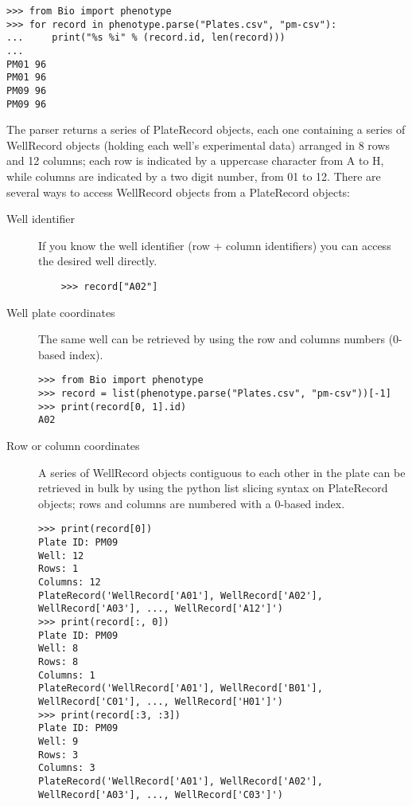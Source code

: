 \begin{verbatim}
>>> from Bio import phenotype
>>> for record in phenotype.parse("Plates.csv", "pm-csv"):
...     print("%s %i" % (record.id, len(record)))
...
PM01 96
PM01 96
PM09 96
PM09 96
\end{verbatim}

The parser returns a series of PlateRecord objects, each one containing a series of WellRecord objects
(holding each well's experimental data) arranged in 8 rows and 12 columns; each row is indicated by
a uppercase character from A to H, while columns are indicated by a two digit number, from 01 to 12.
There are several ways to access WellRecord objects from a PlateRecord objects:

\begin{description}
  \item[Well identifier]
    If you know the well identifier (row + column identifiers) you can access the desired well directly.
    \begin{verbatim}
    >>> record["A02"]
    \end{verbatim}

  \item[Well plate coordinates]
    The same well can be retrieved by using the row and columns numbers (0-based index).

\begin{verbatim}
>>> from Bio import phenotype
>>> record = list(phenotype.parse("Plates.csv", "pm-csv"))[-1]
>>> print(record[0, 1].id)
A02
\end{verbatim}

  \item[Row or column coordinates]
    A series of WellRecord objects contiguous to each other in the plate can be retrieved in bulk by
    using the python list slicing syntax on PlateRecord objects; rows and columns are numbered with
    a 0-based index.

\begin{verbatim}
>>> print(record[0])
Plate ID: PM09
Well: 12
Rows: 1
Columns: 12
PlateRecord('WellRecord['A01'], WellRecord['A02'], WellRecord['A03'], ..., WellRecord['A12']')
>>> print(record[:, 0])
Plate ID: PM09
Well: 8
Rows: 8
Columns: 1
PlateRecord('WellRecord['A01'], WellRecord['B01'], WellRecord['C01'], ..., WellRecord['H01']')
>>> print(record[:3, :3])
Plate ID: PM09
Well: 9
Rows: 3
Columns: 3
PlateRecord('WellRecord['A01'], WellRecord['A02'], WellRecord['A03'], ..., WellRecord['C03']')
\end{verbatim}

\end{description}

